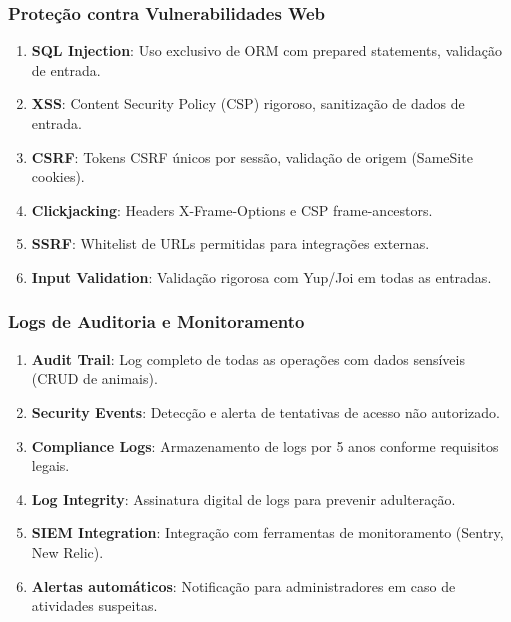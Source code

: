 \documentclass[12pt, a4paper]{article}
\begin{document}
\begin{spacing}{1.5}
\subsubsection{Proteção contra Vulnerabilidades Web}
\begin{spacing}{1.5}
\begin{enumerate}[label=\alph*)]
    \item \textbf{SQL Injection}: Uso exclusivo de ORM com prepared statements, validação de entrada.
    \item \textbf{XSS}: Content Security Policy (CSP) rigoroso, sanitização de dados de entrada.
    \item \textbf{CSRF}: Tokens CSRF únicos por sessão, validação de origem (SameSite cookies).
    \item \textbf{Clickjacking}: Headers X-Frame-Options e CSP frame-ancestors.
    \item \textbf{SSRF}: Whitelist de URLs permitidas para integrações externas.
    \item \textbf{Input Validation}: Validação rigorosa com Yup/Joi em todas as entradas.
\end{enumerate}
\end{spacing}

\subsubsection{Logs de Auditoria e Monitoramento}
\begin{spacing}{1.5}
\begin{enumerate}[label=\alph*)]
    \item \textbf{Audit Trail}: Log completo de todas as operações com dados sensíveis (CRUD de animais).
    \item \textbf{Security Events}: Detecção e alerta de tentativas de acesso não autorizado.
    \item \textbf{Compliance Logs}: Armazenamento de logs por 5 anos conforme requisitos legais.
    \item \textbf{Log Integrity}: Assinatura digital de logs para prevenir adulteração.
    \item \textbf{SIEM Integration}: Integração com ferramentas de monitoramento (Sentry, New Relic).
    \item \textbf{Alertas automáticos}: Notificação para administradores em caso de atividades suspeitas.
\end{enumerate}
\end{spacing}


\end{spacing}
\end{document}
